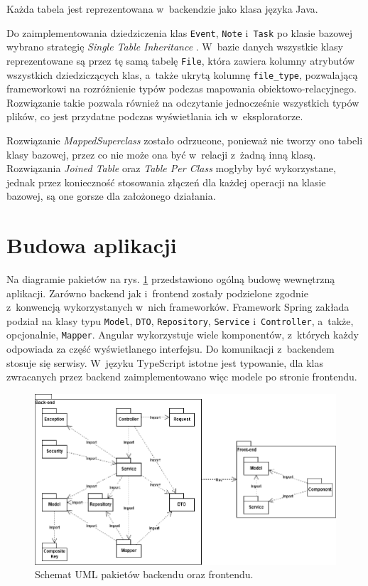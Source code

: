\documentclass[a4paper,twoside,12pt]{book}
\newcommand{\obcy}[1]{\emph{#1}}
\newcommand{\english}[1]{{\selectlanguage{british}\obcy{#1}}}
\begin{document}
Każda tabela jest reprezentowana w~backendzie jako klasa języka Java. 

Do zaimplementowania dziedziczenia klas \texttt{Event}, \texttt{Note} i~\texttt{Task} po klasie bazowej wybrano strategię \english{Single Table Inheritance} \cite{bib:inheritancebaeldung}. W~bazie danych wszystkie klasy reprezentowane są przez tę samą tabelę \texttt{File}, która zawiera kolumny atrybutów wszystkich dziedziczących klas, a~także ukrytą kolumnę \texttt{file_type}, pozwalającą frameworkowi na rozróżnienie typów podczas mapowania obiektowo-relacyjnego. Rozwiązanie takie pozwala również na odczytanie jednocześnie wszystkich typów plików, co jest przydatne podczas wyświetlania ich w~eksploratorze.

Rozwiązanie \english{MappedSuperclass} zostało odrzucone, ponieważ nie tworzy ono tabeli klasy bazowej, przez co nie może ona być w~relacji z~żadną inną klasą. Rozwiązania \english{Joined Table} oraz \english{Table Per Class} mogłyby być wykorzystane, jednak przez konieczność stosowania złączeń dla każdej operacji na klasie bazowej, są one gorsze dla założonego działania.

\section{Budowa aplikacji}

Na diagramie pakietów na rys. \ref{fig:package} przedstawiono ogólną budowę wewnętrzną aplikacji. Zarówno backend jak i~frontend zostały podzielone zgodnie z~konwencją wykorzystanych w~nich frameworków. Framework Spring zakłada podział na klasy typu \texttt{Model}, \texttt{DTO}, \texttt{Repository}, \texttt{Service} i~\texttt{Controller}, a~także, opcjonalnie, \texttt{Mapper}. Angular wykorzystuje wiele komponentów, z~których każdy odpowiada za część wyświetlanego interfejsu. Do komunikacji z~backendem stosuje się serwisy. W~języku TypeScript istotne jest typowanie, dla klas zwracanych przez backend zaimplementowano więc modele po stronie frontendu.

\begin{figure}
\centering
\includegraphics[width=\textwidth]{./UML-Package.png}
\caption{Schemat UML pakietów backendu oraz frontendu.}
\label{fig:package}
\end{figure}
\end{document}
